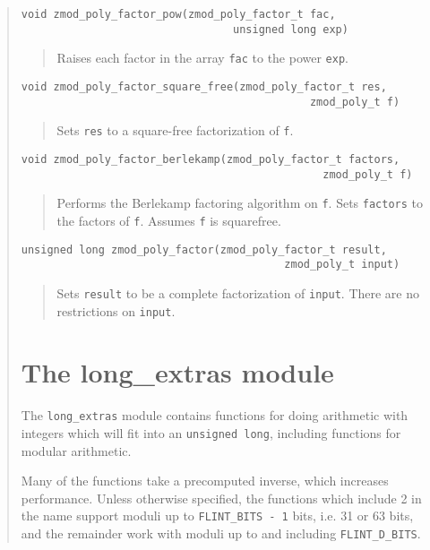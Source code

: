 \documentclass[a4paper,10pt]{article}
\newcommand{\code}{\lstinline}
\begin{document}
\begin{quote}
\begin{lstlisting}
void zmod_poly_factor_pow(zmod_poly_factor_t fac, 
                                 unsigned long exp)
\end{lstlisting}
\begin{quote}
Raises each factor in the array \code{fac} to the power \code{exp}.
\end{quote}

\begin{lstlisting}
void zmod_poly_factor_square_free(zmod_poly_factor_t res,
                                             zmod_poly_t f)
\end{lstlisting}
\begin{quote}
Sets \code{res} to a square-free factorization of \code{f}.
\end{quote}

\begin{lstlisting}
void zmod_poly_factor_berlekamp(zmod_poly_factor_t factors,
                                               zmod_poly_t f)
\end{lstlisting}
\begin{quote}
Performs the Berlekamp factoring algorithm on \code{f}.  Sets \code{factors} to the factors of \code{f}.  Assumes \code{f} is squarefree.  
\end{quote}

\begin{lstlisting}
unsigned long zmod_poly_factor(zmod_poly_factor_t result,
                                         zmod_poly_t input)
\end{lstlisting}
\begin{quote}
Sets \code{result} to be a complete factorization of \code{input}.  There are no restrictions on \code{input}.
\end{quote}

\section{The long\_extras module}
The \code{long_extras} module contains functions for doing arithmetic with integers which will fit into an \code{unsigned long}, including functions for modular arithmetic.

Many of the functions take a precomputed inverse, which increases performance. Unless otherwise specified, the functions which include 2 in the name support moduli up to \code{FLINT_BITS - 1} bits, i.e. 31 or 63 bits, and the remainder work with moduli up to and including \code{FLINT_D_BITS}. 


\end{quote}
\end{document}
